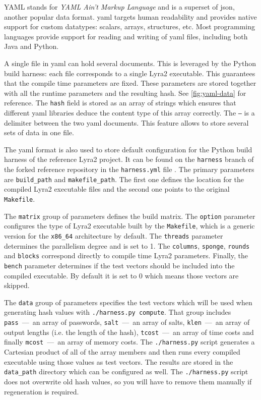 YAML stands for \emph{YAML Ain't Markup Language} and is a superset of \gls{json}, another popular data format. \gls{yaml} targets human readability and provides native support for custom datatypes: scalars, arrays, structures, etc. Most programming languages provide support for reading and writing of \gls{yaml} files, including both Java and Python.

A single file in \gls{yaml} can hold several documents. This is leveraged by the Python build harness: each file corresponds to a single Lyra2 executable. This guarantees that the compile time parameters are fixed. These parameters are stored together with all the runtime parameters and the resulting hash. See \autoref{fig:yaml-data} for reference. The \texttt{hash} field is stored as an array of strings which ensures that different \gls{yaml} libraries deduce the content type of this array correctly. The \texttt{---} is a delimiter between the two \gls{yaml} documents. This feature allows to store several sets of data in one file.

The \gls{yaml} format is also used to store default configuration for the Python build harness of the reference Lyra2 project. It can be found on the \texttt{harness} branch of the forked reference repository in the \texttt{harness.yml} file \cite{github:2017:lyra-copy}. The primary parameters are \texttt{build\_path} and \texttt{makefile\_path}. The first one defines the location for the compiled Lyra2 executable files and the second one points to the original \texttt{Makefile}.

The \texttt{matrix} group of parameters defines the build matrix. The \texttt{option} parameter configures the type of Lyra2 executable built by the \texttt{Makefile}, which is a generic version for the \texttt{x86\_64} architecture by default. The \texttt{threads} parameter determines the parallelism degree and is set to 1. The \texttt{columns}, \texttt{sponge}, \texttt{rounds} and \texttt{blocks} correspond directly to compile time Lyra2 parameters. Finally, the \texttt{bench} parameter determines if the test vectors should be included into the compiled executable. By default it is set to 0 which means those vectors are skipped.

The \texttt{data} group of parameters specifies the test vectors which will be used when generating hash values with \texttt{./harness.py compute}. That group includes \texttt{pass}~---~an array of passwords, \texttt{salt}~---~an array of salts, \texttt{klen}~---~an array of output lengths (i.e. the length of the hash), \texttt{tcost}~---~an array of time costs and finally \texttt{mcost}~---~an array of memory costs. The \texttt{./harness.py} script generates a Cartesian product of all of the array members and then runs every compiled executable using those values as test vectors. The results are stored in the \texttt{data\_path} directory which can be configured as well. The \texttt{./harness.py} script does not overwrite old hash values, so you will have to remove them manually if regeneration is required.

